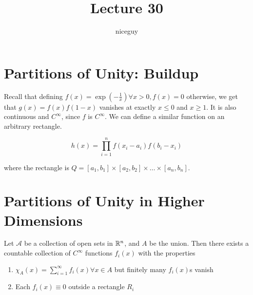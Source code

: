 \documentclass[12pt]{article}
\title{Lecture 30}
\author{niceguy}
\begin{document}
\maketitle

\section{Partitions of Unity: Buildup}

Recall that defining $f(x) = \exp\left(-\frac{1}{x}\right) \forall x > 0, f(x) = 0$ otherwise, we get that $g(x) = f(x)f(1-x)$ vanishes at exactly $x\leq0$ and $x\geq1$. It is also continuous and $C^\infty$, since $f$ is $C^\infty$. We can define a similar function on an arbitrary rectangle.

$$h(x) = \prod_{i=1}^n f(x_i-a_i)f(b_i-x_i)$$

where the rectangle is $Q = [a_1,b_1] \times [a_2,b_2] \times \dots \times [a_n,b_n]$.

\section{Partitions of Unity in Higher Dimensions}

Let $\mathcal A$ be a collection of open sets in $\mathbb{R}^n$, and $A$ be the union. Then there exists a countable collection of $C^\infty$ functions $f_i(x)$ with the properties
\begin{enumerate}
    \item $\chi_A(x) = \sum_{i=1}^\infty f_i(x) \forall x \in A$ but finitely many $f_i(x)$s vanish
    \item Each $f_i(x) \equiv 0$ outside a rectangle $R_i$
\end{enumerate}
\end{document}
